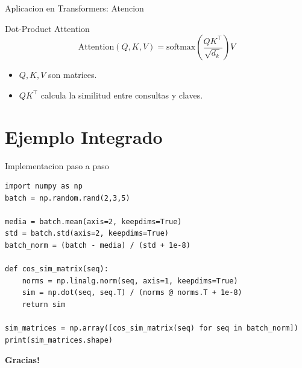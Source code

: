 \documentclass[aspectratio=169, 10pt, xcolor=table]{beamer}
\begin{document}
\begin{frame}{Aplicacion en Transformers: Atencion}
    \begin{block}{Dot-Product Attention}
        \[ \text{Attention}(Q,K,V) = \text{softmax}\left(\frac{QK^\top}{\sqrt{d_k}}\right)V \]
    \end{block}
    \begin{itemize}
        \item $Q,K,V$ son matrices.
        \item $QK^\top$ calcula la similitud entre consultas y claves.
    \end{itemize}
\end{frame}

\section{Ejemplo Integrado}

\begin{frame}[fragile]{Implementacion paso a paso}
\begin{lstlisting}
import numpy as np
batch = np.random.rand(2,3,5)

media = batch.mean(axis=2, keepdims=True)
std = batch.std(axis=2, keepdims=True)
batch_norm = (batch - media) / (std + 1e-8)

def cos_sim_matrix(seq):
    norms = np.linalg.norm(seq, axis=1, keepdims=True)
    sim = np.dot(seq, seq.T) / (norms @ norms.T + 1e-8)
    return sim

sim_matrices = np.array([cos_sim_matrix(seq) for seq in batch_norm])
print(sim_matrices.shape)
\end{lstlisting}
\end{frame}

\begin{frame}
    \centering
    \Huge \textbf{Gracias!}

\end{frame}
\end{document}
